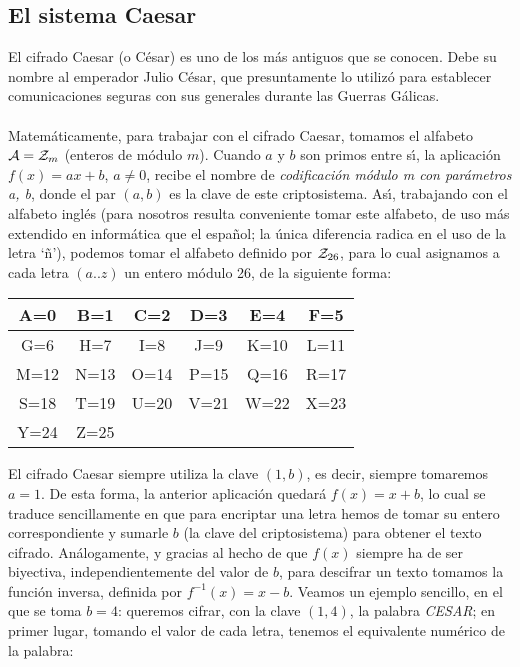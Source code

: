 \subsection{El sistema Caesar}
El cifrado Caesar (o C\'esar) es uno de los m\'as antiguos que se conocen.
Debe su nombre al em\-pe\-ra\-dor Julio C\'esar, que presuntamente lo utiliz\'o 
para establecer comunicaciones seguras con sus generales durante las Guerras 
G\'alicas.\\
\\Matem\'aticamente, para trabajar con el cifrado Caesar, tomamos
el alfabeto ${\cal A}={\cal Z}_{m}$ (enteros de m\'odulo $m$). Cuando $a$ y $b$ 
son primos entre s\'{\i}, la aplicaci\'on $f(x)=ax+b$, $a\neq 0$, recibe el 
nombre de {\it codificaci\'on m\'odulo m con par\'ametros a, b}, donde el par 
$(a,b)$ es la clave de este criptosistema. As\'{\i}, trabajando con el 
alfabeto ingl\'es (para nosotros resulta 
conveniente tomar este alfabeto, de uso m\'as extendido en inform\'atica que el 
espa\~nol; la \'unica diferencia radica en el uso de la letra `\~n'), podemos 
tomar el alfabeto definido por ${\cal Z}_{26}$, para lo cual asignamos a cada 
letra $(a..z)$ un entero m\'odulo 26, de la siguiente forma:
\begin{center}
\begin{tabular}{|c|c|c|c|c|c|}
\hline
A=0 & B=1 & C=2 & D=3 & E=4 & F=5\\ \hline
G=6 & H=7 & I=8 & J=9 & K=10 & L=11\\ \hline
M=12& N=13 & O=14 & P=15 & Q=16 & R=17\\ \hline
S=18 & T=19 & U=20 & V=21 & W=22 & X=23\\ \hline
Y=24 & Z=25 &&&&\\
\hline
\end{tabular}
\end{center}
El cifrado Caesar siempre utiliza la clave $(1,b)$, es decir, siempre
tomaremos $a=1$. De esta forma, la anterior aplicaci\'on quedar\'a
$f(x)=x+b$, lo cual se traduce sencillamente en que para encriptar una letra
hemos de tomar su entero correspondiente y sumarle $b$ (la clave del 
criptosistema) para obtener el texto cifrado. An\'alogamente, y gracias al 
hecho de que $f(x)$ siempre ha de ser biyectiva, independientemente del valor
de $b$, para descifrar un texto tomamos la funci\'on inversa, definida
por $f^{-1}(x)=x-b$. Veamos un ejemplo sencillo, en el que se toma $b=4$:
queremos cifrar, con la clave $(1,4)$, la palabra {\it CESAR}; en primer lugar,
tomando el valor de cada letra, tenemos el equivalente num\'erico de la palabra:
